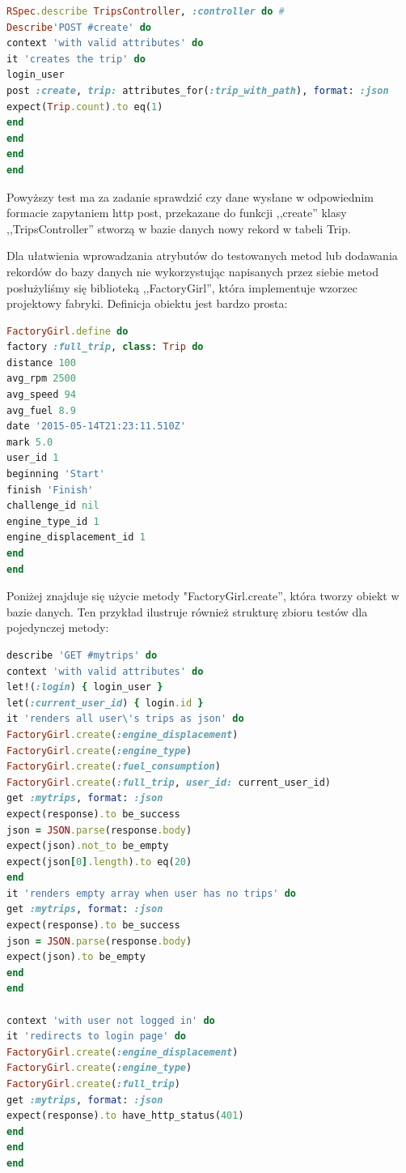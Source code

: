 \documentclass[eng,oneside]{mgr}
\begin{document}
\begin{lstlisting}[language=Ruby, caption={RSpec test jednostkowy.}]
RSpec.describe TripsController, :controller do #
Describe'POST #create' do
context 'with valid attributes' do
it 'creates the trip' do
login_user
post :create, trip: attributes_for(:trip_with_path), format: :json
expect(Trip.count).to eq(1)
end
end
end
end
\end{lstlisting}

Powyższy test ma za zadanie sprawdzić czy dane wysłane w odpowiednim formacie zapytaniem http post, przekazane do funkcji ,,create'' klasy ,,TripsController'' stworzą w bazie danych nowy rekord w tabeli Trip. 

Dla ułatwienia wprowadzania atrybutów do testowanych metod lub dodawania rekordów do bazy danych nie wykorzystując napisanych przez siebie metod posłużyliśmy się biblioteką ,,FactoryGirl'', która implementuje wzorzec projektowy fabryki. Definicja obiektu jest bardzo prosta:

\begin{lstlisting}[language=Ruby, caption={Definicja FactoryGirl.}]
FactoryGirl.define do 
factory :full_trip, class: Trip do
distance 100
avg_rpm 2500
avg_speed 94
avg_fuel 8.9
date '2015-05-14T21:23:11.510Z'
mark 5.0
user_id 1
beginning 'Start'
finish 'Finish'
challenge_id nil
engine_type_id 1
engine_displacement_id 1
end
end
\end{lstlisting}

Poniżej znajduje się użycie metody "FactoryGirl.create'', która tworzy obiekt w bazie danych. Ten przykład ilustruje również strukturę zbioru testów dla pojedynczej metody:

\begin{lstlisting}[language=Ruby, caption={Użycie FactoryGirl.}]
describe 'GET #mytrips' do
context 'with valid attributes' do
let!(:login) { login_user }
let(:current_user_id) { login.id }
it 'renders all user\'s trips as json' do
FactoryGirl.create(:engine_displacement)
FactoryGirl.create(:engine_type)
FactoryGirl.create(:fuel_consumption)
FactoryGirl.create(:full_trip, user_id: current_user_id)
get :mytrips, format: :json
expect(response).to be_success
json = JSON.parse(response.body)
expect(json).not_to be_empty
expect(json[0].length).to eq(20)
end
it 'renders empty array when user has no trips' do
get :mytrips, format: :json
expect(response).to be_success
json = JSON.parse(response.body)
expect(json).to be_empty
end
end

context 'with user not logged in' do
it 'redirects to login page' do
FactoryGirl.create(:engine_displacement)
FactoryGirl.create(:engine_type)
FactoryGirl.create(:full_trip)
get :mytrips, format: :json
expect(response).to have_http_status(401)
end
end
end
\end{lstlisting}
\end{document}
